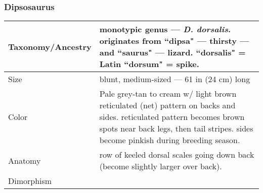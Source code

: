 \subsubsection{Dipsosaurus}
\begin{center}
\begin{longtabu} to 

	\hline
	Taxonomy/Ancestry &
	monotypic genus --- \emph{D. dorsalis}. originates from ``dipsa" --- thirsty --- and ``saurus" --- lizard. ``dorsalis" = Latin ``dorsum" = spike.
	
	 \\
	\hline
	Size & 
	blunt, medium-sized --- 61 in (24 cm) long
	\\
	\hline
	Color &
	Pale grey-tan to cream w/ light brown reticulated (net) pattern on backs and sides. reticulated pattern becomes brown spots near back legs, then tail stripes. sides become pinkish during breeding season.
	 \\
	\hline
	Anatomy &
	row of keeled dorsal scales going down back (become slightly larger over back).
	 \\
	\hline
	Dimorphism & 
	

\end{longtabu}
\end{center}
